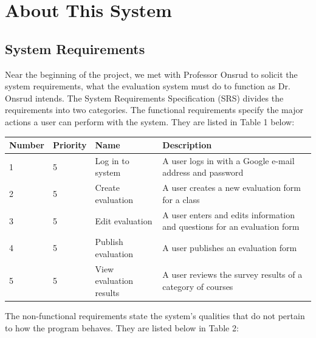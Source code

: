 \documentclass{article}
\begin{document}
\newpage

\section{About This System}

\subsection{System Requirements}

Near the beginning of the project, we met with Professor Onsrud to solicit the system requirements, what the evaluation system must do to function as Dr. Onsrud intends. The System Requirements Specification (SRS) divides the requirements into two categories. The functional requirements specify the major actions a user can perform with the system. They are listed in Table 1 below:

\begin{center}

\begin{tabular}{|p{1.5cm}|p{1.5cm}|p{3.5cm}|p{6cm}|} 
\hline
\textbf{Number} & \textbf{Priority} & \textbf{Name} & \textbf{Description} \\
\hline
1 & 5 & Log in to system & A user logs in with a Google e-mail address and password \\ 
\hline
2 & 5 & Create evaluation & A user creates a new evaluation form for a class \\ 
\hline
3 & 5 & Edit evaluation & A user enters and edits information and questions for an evaluation form \\  
\hline
4 & 5 & Publish evaluation & A user publishes an evaluation form \\
\hline
5 & 5 & View evaluation results & A user reviews the survey results of a category of courses\\ 
\hline
\end{tabular}
\end{center}

The non-functional requirements state the system's qualities that do not pertain to how the program behaves. They are listed below in Table 2:
\end{document}
